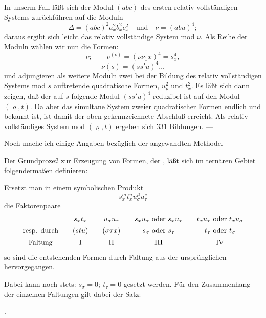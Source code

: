 In unserm Fall läßt sich der Modul $(abc)$ des ersten relativ vollständigen Systems zurückführen auf die Moduln
\[
\Delta=(abc)^2a_x^2b_x^2c_x^2\quad\text{und}\quad \nu=(abu)^4;
\]
daraus ergibt sich leicht das relativ vollständige System mod $\nu$. Als Reihe der Moduln wählen wir nun die Formen:
\[
\nu;\qquad \nu^{(\nu)}=(\nu\nu_1x)^4=s_x^4,
\]
\[
\nu(s)=(ss'u)^4\ldots
\]
und adjungieren als weitere Moduln zwei bei der Bildung des relativ vollständigen Systems mod $s$ auftretende quadratische Formen, $u_\varrho^2$ und $t_x^2$. Es läßt sich dann zeigen, daß der auf $s$ folgende Modul $(ss'u)^4$ reduzibel ist auf den Modul $(\varrho,t)$. Da aber das simultane System zweier quadratischer Formen endlich und bekannt ist, ist damit der oben gekennzeichnete Abschluß erreicht. Als relativ vollständiges System mod $(\varrho,t)$ ergeben sich 331 Bildungen. ---

Noch mache ich einige Angaben bezüglich der angewandten Methode.

Der Grundprozeß zur Erzeugung von Formen, der , läßt sich im ternären Gebiet folgendermaßen definieren:

Ersetzt man in einem symbolischen Produkt
\[
s_x^m t_x^n u_\sigma^\mu u_\tau^\nu
\]
die Faktorenpaare
\[
\begin{array}{@{}c@{\qquad}c@{\qquad}c@{\qquad}c@{\qquad}c@{}}
 & s_xt_x & u_\sigma u_\tau & s_xu_\sigma\ \text{oder}\ s_xu_\tau & t_xu_\tau\ \text{oder}\ t_xu_\sigma\\[0.45em]
\text{resp. durch} & (stu) & (\sigma\tau x) & s_\sigma\ \text{oder}\ s_\tau & t_\tau\ \text{oder}\ t_\sigma\\[0.45em]
\text{Faltung} & \mathrm{I} & \mathrm{II} & \mathrm{III} & \mathrm{IV}
\end{array}
\]
so sind die entstehenden Formen durch Faltung aus der ursprünglichen hervorgegangen.

Dabei kann noch stets: $s_\sigma=0;\ t_\tau=0$ gesetzt werden. Für den Zusammenhang der einzelnen Faltungen gilt dabei der Satz:

.


